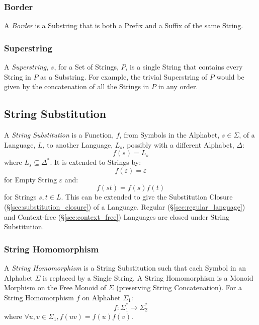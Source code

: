 \subsubsection{Border}\label{sec:string_border}

A \emph{Border} is a Substring that is both a Prefix and a Suffix of
the same String.



\subsubsection{Superstring}\label{sec:superstring}

A \emph{Superstring}, $s$, for a Set of Strings, $P$, is a single
String that contains every String in $P$ as a Substring. For example,
the trivial Superstring of $P$ would be given by the concatenation of
all the Strings in $P$ in any order.



\subsection{String Substitution}\label{sec:string_substitution}

A \emph{String Substitution} is a Function, $f$, from Symbols in the
Alphabet, $s \in \Sigma$, of a Language, $L$, to another Language,
$L_s$, possibly with a different Alphabet, $\Delta$:
\[
  f(s) = L_s
\]
where $L_s \subseteq \Delta^*$. It is extended to Strings by:
\[
  f(\varepsilon) = \varepsilon
\]
for Empty String $\varepsilon$ and:
\[
  f(st) = f(s)f(t)
\]
for Strings $s,t \in L$. This can be extended to give the Substitution
Closure (\S\ref{sec:substitution_closure}) of a Language. Regular
(\S\ref{sec:regular_language}) and Context-free
(\S\ref{sec:context_free}) Languages are closed under String
Substitution.



\subsubsection{String Homomorphism}\label{sec:string_homomorphism}

A \emph{String Homomorphism} is a String Substitution such that each
Symbol in an Alphabet $\Sigma$ is replaced by a Single String. A
String Homomorphism is a Monoid Morphism on the Free Monoid of
$\Sigma$ (preserving String Concatenation). For a String Homomorphism
$f$ on Alphabet $\Sigma_1$:
\[
  f : \Sigma_1^* \rightarrow \Sigma_2^*
\]
where $\forall u,v \in \Sigma_1, f(uv) = f(u)f(v)$.

